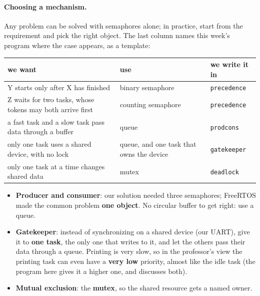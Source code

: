 \paragraph{Choosing a mechanism.} Any problem can be solved with semaphores alone; in practice, start from the requirement and pick the right object. The last column names this week's program where the case appears, as a template:
\begin{center}
\small
\begin{tabular}{P{0.45} P{0.3} P{0.15}}
    \hline
    \textbf{we want} & \textbf{use} & \textbf{we write it in} \\
    \hline
    Y starts only after X has finished & binary semaphore & \texttt{precedence} \\
    Z waits for two tasks, whose tokens may both arrive first & counting semaphore & \texttt{precedence} \\
    a fast task and a slow task pass data through a buffer & queue & \texttt{prodcons} \\
    only one task uses a shared device, with no lock & queue, and one task that owns the device & \texttt{gatekeeper} \\
    only one task at a time changes shared data & mutex & \texttt{deadlock} \\
    \hline
\end{tabular}
\end{center}
\begin{itemize}
    \item \textbf{Producer and consumer}: our solution needed three semaphores; FreeRTOS made the common problem \textbf{one object}. No circular buffer to get right: use a queue.
    \item \textbf{Gatekeeper}: instead of synchronizing on a shared device (our UART), give it to \textbf{one task}, the only one that writes to it, and let the others pass their data through a queue. Printing is very slow, so in the professor's view the printing task can even have a \textbf{very low} priority, almost like the idle task (the program here gives it a higher one, and discusses both).
    \item \textbf{Mutual exclusion}: the \textbf{mutex}, so the shared resource gets a named owner.
\end{itemize}

